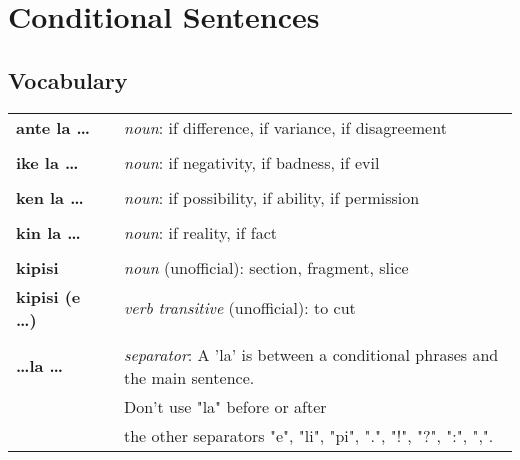 
\section{Conditional Sentences}
\subsection*{Vocabulary}

\begin{supertabular}{p{2,5cm}|ll}
    \textbf{ante la \dots}    &  & \textit{noun}: if difference, if variance, if disagreement                         \\
                              &  &                                                                                    \\
    \textbf{ike la \dots}     &  & \textit{noun}: if negativity, if badness, if evil                                  \\
                              &  &                                                                                    \\
    \textbf{ken la \dots}     &  & \textit{noun}: if possibility, if ability, if permission                           \\
                              &  &                                                                                    \\
    \textbf{kin la \dots}     &  & \textit{noun}: if reality, if fact                                                 \\
                              &  &                                                                                    \\
    \textbf{kipisi}           &  & \textit{noun} (unofficial): section, fragment, slice                               \\
    \textbf{kipisi (e \dots)} &  & \textit{verb transitive} (unofficial): to cut                                      \\
                              &  &                                                                                    \\
    \textbf{\dots la \dots}   &  & \textit{separator}: A 'la' is between a conditional phrases and the main sentence. \\ &&  Don't use "la" before or after \\ && the other separators "e", "li", "pi", ".", "!", "?", ":", ",".  \\

\end{supertabular}
